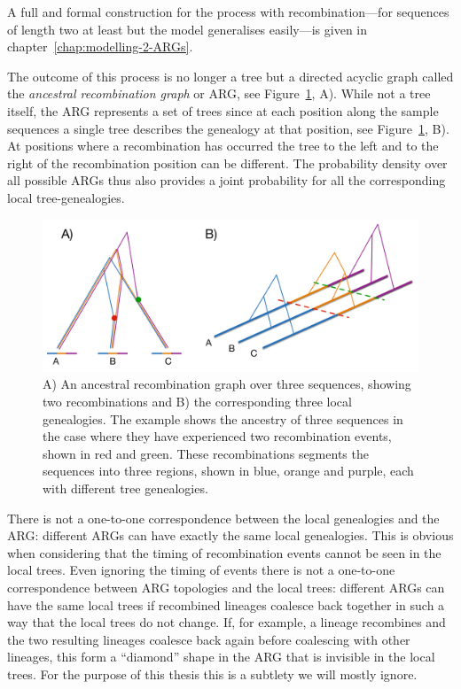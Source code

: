 A full and formal construction for the process with recombination---for sequences of length two at least but the model generalises easily---is given in chapter~\ref{chap:modelling-2-ARGs}.

The outcome of this process is no longer a tree but a directed acyclic graph called the \emph{ancestral recombination graph} or ARG, see Figure~\ref{fig:ARG-and-local-genealogies}, A). While not a tree itself, the ARG represents a set of trees since at each position along the sample sequences a single tree describes the genealogy at that position, see Figure~\ref{fig:ARG-and-local-genealogies}, B). At positions where a recombination has occurred the tree to the left and to the right of the recombination position can be different. The probability density over all possible ARGs thus also provides a joint probability for all the corresponding local tree-genealogies.

\begin{figure}
 \center
  \includegraphics[width=\columnwidth]{Chapters/Sequential-coalescent-figures/ARG-and-local-genealogies}
  \caption{A) An ancestral recombination graph over three sequences, showing two recombinations and B) the corresponding three local genealogies. The example shows the ancestry of three sequences in the case where they have experienced two recombination events, shown in red and green. These recombinations segments the sequences into three regions, shown in blue, orange and purple, each with different tree genealogies.}
  \label{fig:ARG-and-local-genealogies}
\end{figure}

There is not a one-to-one correspondence between the local genealogies and the ARG: different ARGs can have exactly the same local genealogies. This is obvious when considering that the timing of recombination events cannot be seen in the local trees. Even ignoring the timing of events there is not a one-to-one correspondence between ARG topologies and the local trees: different ARGs can have the same local trees if recombined lineages coalesce back together in such a way that the local trees do not change. If, for example, a lineage recombines and the two resulting lineages coalesce back again before coalescing with other lineages, this form a ``diamond'' shape in the ARG that is invisible in the local trees. For the purpose of this thesis this is a subtlety we will mostly ignore.

